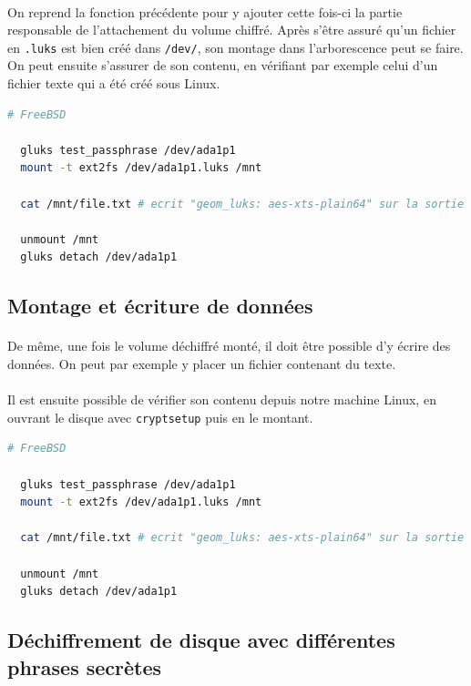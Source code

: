 \paragraph{}
On reprend la fonction précédente pour y ajouter cette fois-ci la partie
responsable de l'attachement du volume chiffré. Après s'être assuré qu'un
fichier en \texttt{.luks} est bien créé dans \texttt{/dev/}, son montage dans
l'arborescence peut se faire. On peut ensuite s'assurer de son contenu, en
vérifiant par exemple celui d'un fichier texte qui a été créé sous Linux.
\\
\begin{lstlisting}[language=bash]
  # FreeBSD

  gluks test_passphrase /dev/ada1p1
  mount -t ext2fs /dev/ada1p1.luks /mnt
  
  cat /mnt/file.txt # ecrit "geom_luks: aes-xts-plain64" sur la sortie standard

  unmount /mnt
  gluks detach /dev/ada1p1
\end{lstlisting}

\subsection{Montage et écriture de données}
\paragraph{}
De même, une fois le volume déchiffré monté, il doit être possible d'y écrire
des données. On peut par exemple y placer un fichier contenant du texte.
\paragraph{}
Il est ensuite possible de vérifier son contenu depuis notre machine Linux, en
ouvrant le disque avec \texttt{cryptsetup} puis en le montant.
\\
\begin{lstlisting}[language=bash]
  # FreeBSD

  gluks test_passphrase /dev/ada1p1
  mount -t ext2fs /dev/ada1p1.luks /mnt
  
  cat /mnt/file.txt # ecrit "geom_luks: aes-xts-plain64" sur la sortie standard

  unmount /mnt
  gluks detach /dev/ada1p1
\end{lstlisting}

\subsection{Déchiffrement de disque avec différentes phrases secrètes}
